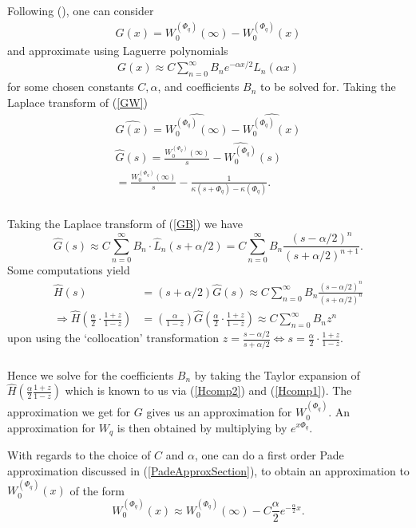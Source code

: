 \documentclass[xcolor=pdftex,dvipsnames,table]{beamer}
\theoremstyle{definition}
\def\lt{\left}
\def\rt{\right}
\begin{document}
\begin{frame}
\frametitle{\insertsectionhead}
\framesubtitle{\insertsubsectionhead}
Following (\cite{abate1998numerical}), one can consider
\begin{align} \label{GW}
G(x) = W^{(\Phi_q)}_0(\infty) - W^{(\Phi_q)}_0 (x)
\end{align}
and approximate using Laguerre polynomials
\begin{align} \label{GB}
G(x) \approx C \sum_{n=0}^{\infty} B_n e^{-\alpha x/2} L_n(\alpha x)
\end{align}
for some chosen constants $C, \alpha$, and coefficients $B_n$ to be solved for. Taking the Laplace transform of (\ref{GW})
\begin{align}
\widehat{G (x)} = \widehat{W^{(\Phi_q)}_0(\infty)} - \widehat{W^{(\Phi_q)}_0 (x)} \nonumber \\
\hat{G}(s)= \frac{W^{(\Phi_q)}_0(\infty)}{s} - \widehat{W^{(\Phi_q)}_0} (s) \nonumber \\
=  \frac{W^{(\Phi_q)}_0(\infty)}{s} - \frac{1}{\kappa(s + \Phi_q) - \kappa(\Phi_q)}. \label{Hcomp1}
\end{align}
\end{frame}

\begin{frame}
\frametitle{\insertsectionhead}
\framesubtitle{\insertsubsectionhead}
Taking the Laplace transform of (\ref{GB}) we have
\[
\hat{G}(s) \approx C \sum_{n=0}^{\infty} B_n \cdot \hat{L}_n(s+\alpha / 2) = C \sum_{n=0}^{\infty} B_n \frac{(s - \alpha / 2)^n}{ (s+\alpha/2)^{n+1}}.
\]
Some computations yield
\begin{align}
\hat{H}(s) &= (s+\alpha/2) \hat{G}(s) \approx C \sum_{n=0}^{\infty} B_n \frac{(s - \alpha / 2)^n}{ (s+\alpha/2)^{n}} \nonumber \\
\Rightarrow \hat{H} \lt( \frac{\alpha}{2} \cdot \frac{1+z}{1-z} \rt) &= \lt( \frac{\alpha}{1-z} \rt) \hat{G} \lt( \frac{\alpha}{2} \cdot \frac{1+z}{1-z} \rt)  \approx C \sum_{n=0}^{\infty} B_n z^n \label{Hcomp2}
\end{align}
upon using the `collocation' transformation $z = \frac{s - \alpha/2}{s + \alpha/2} \iff s = \frac{\alpha}{2} \cdot \frac{1+z}{1-z}$.
\end{frame}


\begin{frame}
\frametitle{\insertsectionhead}
\framesubtitle{\insertsubsectionhead}
Hence we solve for the coefficients $B_n$ by taking the Taylor expansion of $\hat{H} \lt( \frac{\alpha}{2} \frac{1+z}{1-z} \rt)$ which is known to us via (\ref{Hcomp2}) and (\ref{Hcomp1}). The approximation we get for $G$ gives us an approximation for $ W^{(\Phi_q)}_0$. An approximation for $W_q$ is then obtained by multiplying by $e^{x \Phi_q}$.

With regards to the choice of $C$ and $\alpha$, one can do a first order Pade approximation discussed in (\ref{PadeApproxSection}), to obtain an approximation to $W^{(\Phi_q)}_0 (x)$ of the form
\[
W^{(\Phi_q)}_0 (x) \approx W^{(\Phi_q)}_0 (\infty) - C \frac{\alpha}{2} e^{-\frac{\alpha}{2}x}.
\]
\end{frame}
\end{document}
